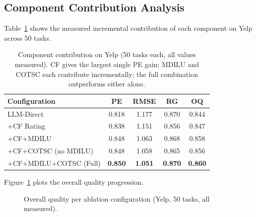 \documentclass[11pt]{article}
\begin{document}
\subsection{Component Contribution Analysis}

Table~\ref{tab:ablation} shows the measured incremental contribution of each
component on Yelp across 50 tasks.

\begin{table}[H]
\centering
\begin{tabular}{lcccc}
\toprule
\textbf{Configuration} & \textbf{PE} & \textbf{RMSE} & \textbf{RG} & \textbf{OQ} \\
\midrule
LLM-Direct               & 0.818 & 1.177 & 0.870 & 0.844 \\
+CF Rating               & 0.838 & 1.151 & 0.856 & 0.847 \\
+CF+MDILU                & 0.848 & 1.063 & 0.868 & 0.858 \\
+CF+COTSC (no MDILU)     & 0.848 & 1.058 & 0.865 & 0.856 \\
+CF+MDILU+COTSC (Full)   & \textbf{0.850} & \textbf{1.051} & \textbf{0.870} & \textbf{0.860} \\
\bottomrule
\end{tabular}
\caption{Component contribution on Yelp (50 tasks each, all values measured).
  CF gives the largest single PE gain; MDILU and COTSC each contribute
  incrementally; the full combination outperforms either alone.}
\label{tab:ablation}
\end{table}

Figure~\ref{fig:ablation_chart} plots the overall quality progression.

\begin{figure}[H]
\centering
{}
\caption{Overall quality per ablation configuration (Yelp, 50 tasks, all measured).}
\label{fig:ablation_chart}
\end{figure}
\end{document}
